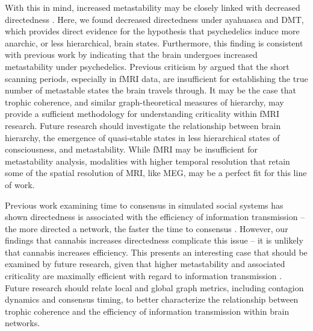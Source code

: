 With this in mind, increased metastability may be closely linked with decreased directedness \parencite{Lord2019}. Here, we found decreased directedness under ayahuasca and DMT, which provides direct evidence for the hypothesis that psychedelics induce more anarchic, or less hierarchical, brain states. Furthermore, this finding is consistent with previous work by \textcite{Lord2019} indicating that the brain undergoes increased metastability under psychedelics. Previous criticism by \textcite{Papo2016} argued that the short scanning periods, especially in fMRI data, are insufficient for establishing the true number of metastable states the brain travels through. It may be the case that trophic coherence, and similar
graph-theoretical measures of hierarchy, may provide a sufficient methodology for understanding criticality
within fMRI research. Future research should investigate the relationship between brain hierarchy, the
emergence of quasi-stable states in less hierarchical states of consciousness, and metastability. While fMRI
may be insufficient for metastability analysis, modalities with higher temporal resolution that retain
some of the spatial resolution of MRI, like MEG, may be a perfect fit for this line of work. 

Previous work examining time to consensus in simulated social systems has shown directedness is associated with the efficiency of information transmission -- the more directed a network, the faster the time to consensus \parencite{Pilgrim2020}. However, our findings
that cannabis increases directedness complicate this
issue -- it is unlikely that cannabis increases efficiency. This presents an interesting case that should be examined by future research, given that higher metastability and associated criticality are maximally efficient with regard to information transmission \parencite{Shew2009, Shew2013, Barnett2013}. Future research should relate local and global graph metrics, including contagion dynamics and consensus timing, to better characterize the relationship
between trophic coherence and the efficiency of information transmission within brain networks.


